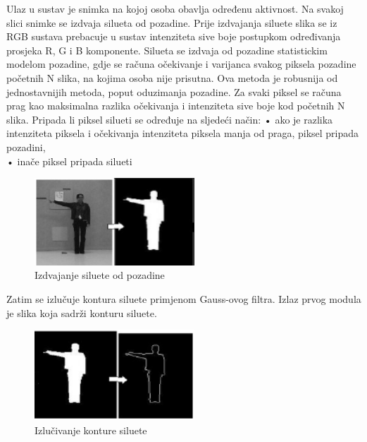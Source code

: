 \documentclass[times, utf8, diplomski]{fer}
\begin{document}
Ulaz u sustav je snimka na kojoj osoba obavlja određenu aktivnost. Na svakoj slici snimke se
izdvaja silueta od pozadine. Prije izdvajanja siluete slika se iz RGB sustava prebacuje u sustav
intenziteta sive boje postupkom određivanja prosjeka R, G i B komponente. Silueta se izdvaja
od pozadine statistickim modelom pozadine, gdje se računa očekivanje i varijanca svakog
piksela pozadine početnih N slika, na kojima osoba nije prisutna. Ova metoda je robusnija od
jednostavnijih metoda, poput oduzimanja pozadine. Za svaki piksel se računa prag kao
maksimalna razlika očekivanja i intenziteta sive boje kod početnih N slika. Pripada li piksel
silueti se određuje na sljedeći način: 
\newline
• ako je razlika intenziteta piksela i očekivanja intenziteta piksela manja od praga, piksel
pripada pozadini, \\
• inače piksel pripada silueti \\
\newline
\begin{figure}[ht!]
\centering
\includegraphics[width=60mm]{pozadina1.png}
\caption{ Izdvajanje siluete od pozadine \label{overflow}}
\end{figure}



Zatim se izlučuje kontura siluete primjenom Gauss-ovog filtra. Izlaz prvog modula je slika
koja sadrži konturu siluete.
\newline
\begin{figure}[ht!]
\centering
\includegraphics[width=60mm]{pozadina2.png}
\caption{ Izlučivanje konture siluete \label{overflow}}
\end{figure}
\end{document}
